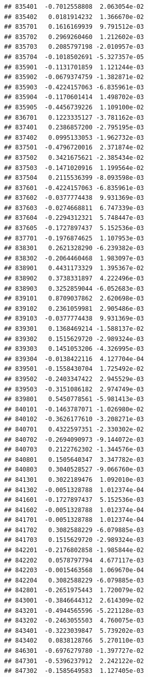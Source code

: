\begin{frame}[fragile]
\begin{verbatim}
## 835401  -0.7012558808  2.063054e-02
## 835402   0.0181914232  1.366670e-02
## 835701   0.1616169939  9.791512e-03
## 835702   0.2969260460  1.212602e-03
## 835703   0.2085797198 -2.010957e-03
## 835704  -0.1018502691 -5.327357e-05
## 835901  -0.1131701859  1.121244e-03
## 835902  -0.0679374759 -1.382871e-02
## 835903  -0.4224157063 -6.835961e-03
## 835904  -0.1170601414  1.498702e-03
## 835905  -0.4456739226  1.109100e-02
## 836701   0.1223335127 -3.781162e-03
## 837401   0.2386857200 -2.795195e-03
## 837402   0.0995133053 -1.962732e-03
## 837501  -0.4796720016  2.371874e-02
## 837502   0.3421675621 -2.385434e-02
## 837503  -0.1471020916  1.199564e-02
## 837504   0.2115536399 -8.093598e-03
## 837601  -0.4224157063 -6.835961e-03
## 837602  -0.0377774438  9.931369e-03
## 837603  -0.0274668811  6.747339e-03
## 837604  -0.2294312321  5.748447e-03
## 837605  -0.1727897437  5.152536e-03
## 837701  -0.1976874625  1.107953e-03
## 838301   0.2621328290 -6.239382e-03
## 838302  -0.2064460468  1.983097e-03
## 838901   0.4431173329  1.395367e-02
## 838902   0.3738331897  4.222496e-03
## 838903   0.3252859044 -6.052683e-03
## 839101   0.8709037862  2.620698e-03
## 839102   0.2361059981  2.905486e-03
## 839103  -0.0377774438  9.931369e-03
## 839301   0.1368469214 -1.588137e-02
## 839302   0.1515629720 -2.989324e-03
## 839303   0.1451053206 -4.326995e-03
## 839304  -0.0138422116  4.127704e-04
## 839501  -0.1558430704  1.725492e-02
## 839502  -0.2403347422  2.945529e-03
## 839503  -0.3151086182  2.974749e-03
## 839801   0.5450778561 -5.981413e-03
## 840101  -0.1463787071 -1.026980e-02
## 840102  -0.3626177610 -3.208271e-03
## 840701   0.4322597351 -2.330302e-02
## 840702  -0.2694090973 -9.144072e-03
## 840703   0.2122762302 -1.344576e-03
## 840801   0.1505640347  3.347782e-03
## 840803   0.3040528527 -9.066760e-03
## 841301   0.3022189476  1.092010e-03
## 841302  -0.0051328788  1.012374e-04
## 841601  -0.1727897437  5.152536e-03
## 841602  -0.0051328788  1.012374e-04
## 841701  -0.0051328788  1.012374e-04
## 841702   0.3082588229 -6.079885e-03
## 841703   0.1515629720 -2.989324e-03
## 842201  -0.2176802858 -1.985844e-02
## 842202   0.0578797794  4.677117e-03
## 842203  -0.0015463568  1.069670e-04
## 842204   0.3082588229 -6.079885e-03
## 842801  -0.2651975443  1.720079e-02
## 843001  -0.3846644312  2.614309e-02
## 843201  -0.4944565596 -5.221128e-03
## 843202  -0.2463055503  4.760075e-03
## 843401  -0.3223039847  5.739202e-03
## 843402   0.0838128766  5.270110e-03
## 846301  -0.6976279780 -1.397727e-02
## 847301  -0.5396237912  2.242122e-02
## 847302  -0.1585649583  1.127405e-03

\end{verbatim}
\end{frame}
